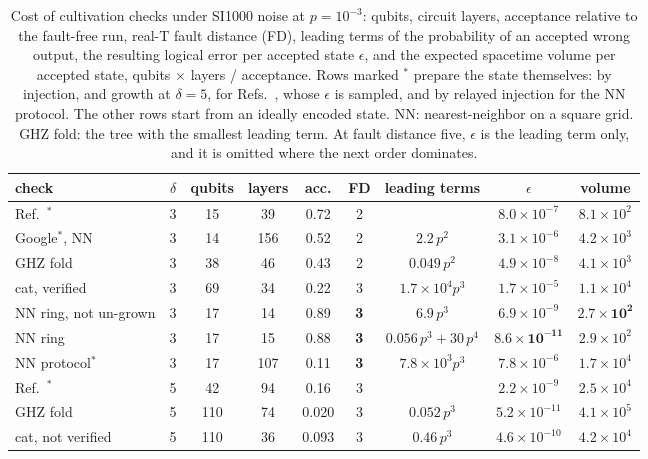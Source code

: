\documentclass[aps,prl,reprint,twocolumn,amsmath,amssymb,floatfix,nofootinbib,superscriptaddress]{revtex4-2}
\theoremstyle{definition}
\theoremstyle{remark}
\begin{document}
\begin{table}[t]
\caption{Cost of cultivation checks under SI1000 noise at $p=10^{-3}$: qubits, circuit layers, acceptance relative to the fault-free run, real-T fault distance (FD), leading terms of the probability of an accepted wrong output, the resulting logical error per accepted state $\epsilon$, and the expected spacetime volume per accepted state, qubits $\times$ layers / acceptance. Rows marked $^*$ prepare the state themselves: by injection, and growth at $\delta=5$, for Refs.~\cite{cultivation,googlecultivation}, whose $\epsilon$ is sampled, and by relayed injection for the NN protocol. The other rows start from an ideally encoded state. NN: nearest-neighbor on a square grid. GHZ fold: the tree with the smallest leading term. At fault distance five, $\epsilon$ is the leading term only, and it is omitted where the next order dominates.}
\label{tab:cost}
\begin{ruledtabular}
\begin{tabular}{lcccccccc}
check & $\delta$ & qubits & layers & acc. & FD & leading terms & $\epsilon$ & volume \\
\hline
Ref.~\cite{cultivation}$^*$ & 3 & 15 & 39 & 0.72 & 2 & & $8.0\times10^{-7}$ & $8.1\times10^2$ \\
Google$^*$, NN & 3 & 14 & 156 & 0.52 & 2 & $2.2\,p^2$ & $3.1\times10^{-6}$ & $4.2\times10^3$ \\
GHZ fold & 3 & 38 & 46 & 0.43 & 2 & $0.049\,p^2$ & $4.9\times10^{-8}$ & $4.1\times10^3$ \\
cat, verified & 3 & 69 & 34 & 0.22 & 3 & $1.7\times10^4p^3$ & $1.7\times10^{-5}$ & $1.1\times10^4$ \\
NN ring, not un-grown & 3 & 17 & 14 & 0.89 & \textbf{3} & $6.9\,p^3$ & $6.9\times10^{-9}$ & $\mathbf{2.7\times10^2}$ \\
NN ring & 3 & 17 & 15 & 0.88 & \textbf{3} & $0.056\,p^3+30\,p^4$ & $\mathbf{8.6\times10^{-11}}$ & $2.9\times10^2$ \\
NN protocol$^*$ & 3 & 17 & 107 & 0.11 & \textbf{3} & $7.8\times10^3p^3$ & $7.8\times10^{-6}$ & $1.7\times10^4$ \\
\hline
Ref.~\cite{cultivation}$^*$ & 5 & 42 & 94 & 0.16 & 3 & & $2.2\times10^{-9}$ & $2.5\times10^4$ \\
GHZ fold & 5 & 110 & 74 & 0.020 & 3 & $0.052\,p^3$ & $5.2\times10^{-11}$ & $4.1\times10^5$ \\
cat, not verified & 5 & 110 & 36 & 0.093 & 3 & $0.46\,p^3$ & $4.6\times10^{-10}$ & $4.2\times10^4$ \\

\end{tabular}
\end{ruledtabular}
\end{table}
\end{document}
